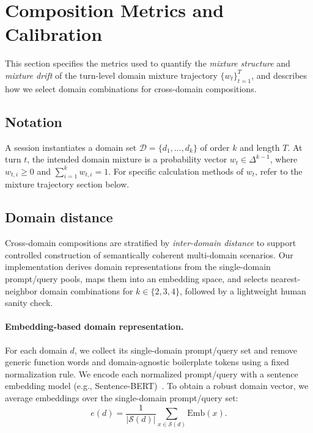 \clearpage
{}
\section{Composition Metrics and Calibration}
\label{app:composition_metrics}

This section specifies the metrics used to quantify the \emph{mixture structure} and \emph{mixture drift}
of the turn-level domain mixture trajectory $\{w_t\}_{t=1}^{T}$, and describes how we select domain combinations for cross-domain compositions.

\subsection{Notation}
A session instantiates a domain set $\mathcal{D}=\{d_1,\ldots,d_k\}$ of order $k$ and length $T$.
At turn $t$, the intended domain mixture is a probability vector
$w_t \in \Delta^{k-1}$, where $w_{t,i}\ge 0$ and $\sum_{i=1}^{k} w_{t,i}=1$.
For specific calculation methods of $w_t$, refer to the mixture trajectory section below.

\subsection{Domain distance}
\label{app:domain_distance}

Cross-domain compositions are stratified by \emph{inter-domain distance} to support controlled construction of semantically coherent multi-domain scenarios.
Our implementation derives domain representations from the single-domain prompt/query pools, maps them into an embedding space, and selects nearest-neighbor domain combinations for $k\in\{2,3,4\}$, followed by a lightweight human sanity check.

\paragraph{Embedding-based domain representation.}
For each domain $d$, we collect its single-domain prompt/query set and remove generic function words and domain-agnostic boilerplate tokens using a fixed normalization rule.
We encode each normalized prompt/query with a sentence embedding model (e.g., Sentence-BERT)~\citep{reimers-gurevych-2019-sentence}.
To obtain a robust domain vector, we average embeddings over the single-domain prompt/query set:
\begin{equation}
\label{eq:domain_embed}
e(d)=\frac{1}{\left|\mathcal{S}(d)\right|}\sum_{x\in \mathcal{S}(d)} \mathrm{Emb}(x).
\end{equation}

